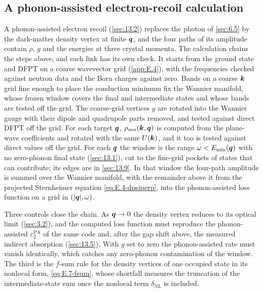 \subsection{A phonon-assisted electron-recoil calculation}

A phonon-assisted electron recoil (\cref{sec:13.2}) replaces the photon of \cref{sec:6.5} by the dark-matter density vertex at finite $\bm{q}$, and the four paths of its amplitude contain $\rho$, $g$ and the energies at three crystal momenta. The calculation chains the steps above, and each link has its own check. It starts from the ground state and DFPT on a coarse wavevector grid (\cref{app:E.4}), with the frequencies checked against neutron data and the Born charges against zero. Bands on a coarse $\bm{k}$ grid fine enough to place the conduction minimum fix the Wannier manifold, whose frozen window covers the final and intermediate states and whose bands are tested off the grid. The coarse-grid vertices $g$ are rotated into the Wannier gauge with their dipole and quadrupole parts removed, and tested against direct DFPT off the grid. For each target $\bm{q}$, $\rho_{mn}(\bm{k},\bm{q})$ is computed from the plane-wave coefficients and rotated with the same $U(\bm{k})$, and it too is tested against direct values off the grid. For each $\bm{q}$ the window is the range $\omega < E_{\mathrm{min}}(\bm{q})$ with no zero-phonon final state (\cref{sec:13.1}), cut to the fine-grid pockets of states that can contribute; its edges are in \cref{sec:13.9}. In that window the four-path amplitude is summed over the Wannier manifold, with the remainder above it from the projected Sternheimer equation \cref{eq:E.4-dpsiperp}, into the phonon-assisted loss function on a grid in $(|\bm{q}|,\omega)$.

Three controls close the chain. As $\bm{q}\to0$ the density vertex reduces to its optical limit (\cref{sec:3.2}), and the computed loss function must reproduce the phonon-assisted $\varepsilon_2^{\mathrm{PA}}$ of the same code and, after the gap shift above, the measured indirect absorption (\cref{sec:13.5}). With $g$ set to zero the phonon-assisted rate must vanish identically, which catches any zero-phonon contamination of the window. The third is the $f$-sum rule for the density vertices of one occupied state in its nonlocal form, \cref{eq:E.7-fsum}, whose shortfall measures the truncation of the intermediate-state sum once the nonlocal term $\delta_{\mathrm{NL}}$ is included.

